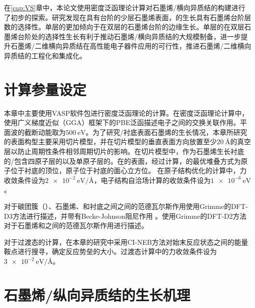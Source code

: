 在\ref{cap:VS}章中，本论文使用密度泛函理论计算对石墨烯/横向异质结的构建进行了初步的探索。研究发现在具有台阶的少层石墨烯表面，的生长具有石墨烯台阶层数的选择性。单层的更加倾向于在双层的石墨烯台阶的边缘生长。单层的在双层石墨烯台阶处的选择性生长有利于推动石墨烯/横向异质结的大规模制备，进一步提升石墨烯/二维横向异质结在高性能电子器件应用的可行性，推进石墨烯/二维横向异质结的工程化和集成化。

\section{计算参量设定}

本章中主要使用VASP软件包进行密度泛函理论的计算。在密度泛函理论计算中，使用广义梯度近似（GGA）框架下的PBE泛函描述电子之间的交换关联作用。平面波的截断动能取为$\SI{500}{\electronvolt}$。为了研究/衬底表面石墨烯的生长情况，本章所研究的表面构型主要采用切片模型，并在切片模型的垂直表面方向放置至少$\SI{20}{\angstrom}$的真空层以防止周期性条件相邻周期切片的影响。在切片模型中，作为石墨烯生长衬底的/包含四原子层的以及单原子层的。在的表面，经过计算，的最优堆叠方式为原子位于衬底的顶位，原子位于衬底的面心立方位。
在原子结构优化的计算中，力收敛条件设为$\SI{2e-2}{\electronvolt \per \angstrom}$，电子结构自洽场计算的收敛条件设为$\SI{1e-6}{\electronvolt}$。

对于碳团簇（）、石墨烯、和衬底之间之间的范德瓦尔斯作用使用Grimme的DFT-D3方法进行描述，并带有Becke-Johnson阻尼作用 。使用Grimme的DFT-D2方法对于石墨烯和之间的范德瓦尔斯作用进行描述。

对于过渡态的计算，在本章的研究中采用CI-NEB方法对始末反应状态之间的能量鞍点进行搜寻，确定反应势垒的大小。过渡态计算中的力收敛条件设为$\SI{3e-2}{\electronvolt \per \angstrom}$。

\section{石墨烯/纵向异质结的生长机理}
    \label{cap:CG}

